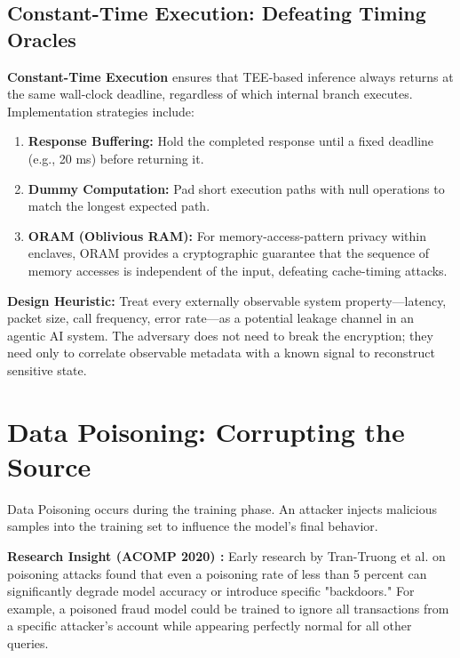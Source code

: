 \subsection{Constant-Time Execution: Defeating Timing Oracles}
\label{subsec:constant_time}

\textbf{Constant-Time Execution} ensures that TEE-based inference always returns at the same wall-clock deadline, regardless of which internal branch executes. Implementation strategies include:
\begin{enumerate}
  \item \textbf{Response Buffering:} Hold the completed response until a fixed deadline (e.g., 20 ms) before returning it.
  \item \textbf{Dummy Computation:} Pad short execution paths with null operations to match the longest expected path.
  \item \textbf{ORAM (Oblivious RAM):} For memory-access-pattern privacy within enclaves, ORAM \cite{goldreich1996} provides a cryptographic guarantee that the sequence of memory accesses is independent of the input, defeating cache-timing attacks.
\end{enumerate}

\begin{svgraybox}
\textbf{Design Heuristic:} Treat every externally observable system property---latency, packet size, call frequency, error rate---as a potential leakage channel in an agentic AI system. The adversary does not need to break the encryption; they need only to correlate observable metadata with a known signal to reconstruct sensitive state.
\end{svgraybox}

\section{Data Poisoning: Corrupting the Source}
\label{sec:data_poisoning}

Data Poisoning occurs during the training phase. An attacker injects malicious samples into the training set to influence the model's final behavior.

\begin{svgraybox}
\textbf{Research Insight (ACOMP 2020) \cite{trantruong2020}:} Early research by Tran-Truong et al. on poisoning attacks found that even a poisoning rate of less than 5 percent can significantly degrade model accuracy or introduce specific "backdoors." For example, a poisoned fraud model could be trained to ignore all transactions from a specific attacker's account while appearing perfectly normal for all other queries.
\end{svgraybox}

